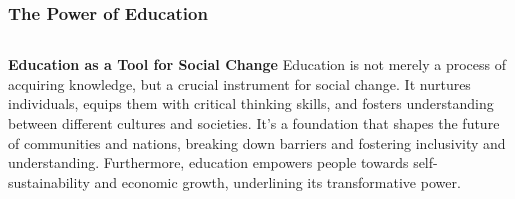 \documentclass[5pt]{beamer}
\begin{document}
\begin{frame}
\frametitle{The Power of Education}
\begin{columns}
\begin{column}{0.7\textwidth}
\begin{block}{\textbf{Education as a Tool for Social Change}}
Education is not merely a process of acquiring knowledge, but a crucial instrument for social change. It nurtures individuals, equips them with critical thinking skills, and fosters understanding between different cultures and societies. It's a foundation that shapes the future of communities and nations, breaking down barriers and fostering inclusivity and understanding. Furthermore, education empowers people towards self-sustainability and economic growth, underlining its transformative power.
\end{block}
\end{column}
\end{columns}
\end{frame}
\end{document}

